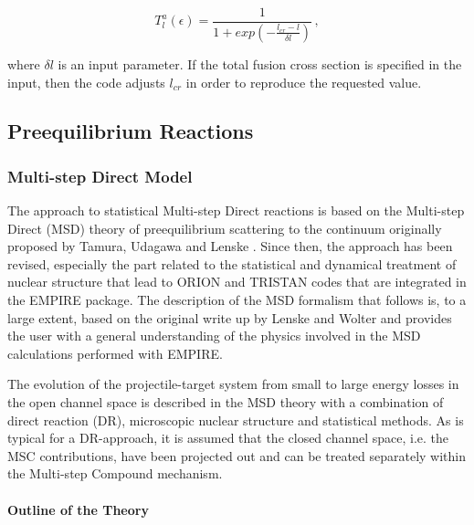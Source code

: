 \begin{equation}
T_{l}^{a}(\epsilon)=\frac{1}{1+exp(-\frac{l_{cr}-l}{\delta l})}\,,
\label{Tlfus}
\end{equation}

\noindent where $\delta l$ is an input parameter. If the total fusion cross
section is specified in the input, then the code adjusts $l_{cr}$ in order
to reproduce the requested value.

\subsection{Preequilibrium Reactions}


\subsubsection{Multi-step Direct Model\label{sec: MSD}}

The approach to statistical Multi-step Direct%
 reactions is based on the Multi-step Direct (MSD) theory of
preequilibrium scattering to the continuum originally proposed by Tamura,
Udagawa and Lenske \cite{TUL}. Since then, the approach has been revised,
especially the part related to the statistical and dynamical treatment of
nuclear structure that lead to ORION and TRISTAN codes that are integrated in
the EMPIRE package. The description of the MSD formalism that follows is, to
a large extent, based on the original write up by Lenske and Wolter and
provides the user with a general understanding of the physics involved in
the MSD calculations performed with EMPIRE.

The evolution of the projectile-target system from small to large energy
losses in the open channel space is described in the MSD theory with a
combination of direct reaction (DR), microscopic nuclear structure and
statistical methods. As is typical for a DR-approach, it is assumed that the
closed channel space, i.e. the MSC%
 contributions, have been projected out and can be treated
separately within the Multi-step Compound%
 mechanism.

\medskip

\paragraph{\label{sec:MSDtheory}Outline of the Theory}

